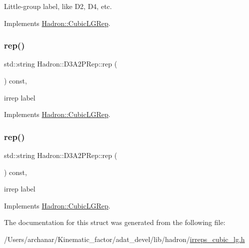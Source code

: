 Little-\/group label, like D2, D4, etc. 

Implements \mbox{\hyperlink{structHadron_1_1CubicLGRep_a9bdb14b519a611d21379ed96a3a9eb41}{Hadron\+::\+Cubic\+L\+G\+Rep}}.

\mbox{\label{structHadron_1_1D3A2PRep_a8a5821f9be07ae2bd87e63ac151c6d68}} 
\subsubsection{\texorpdfstring{rep()}{rep()}\hspace{0.1cm}{\footnotesize\ttfamily [1/2]}}
{\footnotesize\ttfamily std\+::string Hadron\+::\+D3\+A2\+P\+Rep\+::rep (\begin{DoxyParamCaption}{ }\end{DoxyParamCaption}) const\hspace{0.3cm}{\ttfamily [inline]}, {\ttfamily [virtual]}}

irrep label 

Implements \mbox{\hyperlink{structHadron_1_1CubicLGRep_a50f5ddbb8f4be4cee0106fa9e8c75e6c}{Hadron\+::\+Cubic\+L\+G\+Rep}}.

\mbox{\label{structHadron_1_1D3A2PRep_a8a5821f9be07ae2bd87e63ac151c6d68}} 
\subsubsection{\texorpdfstring{rep()}{rep()}\hspace{0.1cm}{\footnotesize\ttfamily [2/2]}}
{\footnotesize\ttfamily std\+::string Hadron\+::\+D3\+A2\+P\+Rep\+::rep (\begin{DoxyParamCaption}{ }\end{DoxyParamCaption}) const\hspace{0.3cm}{\ttfamily [inline]}, {\ttfamily [virtual]}}

irrep label 

Implements \mbox{\hyperlink{structHadron_1_1CubicLGRep_a50f5ddbb8f4be4cee0106fa9e8c75e6c}{Hadron\+::\+Cubic\+L\+G\+Rep}}.



The documentation for this struct was generated from the following file\+:\begin{DoxyCompactItemize}
\item 
/\+Users/archanar/\+Kinematic\+\_\+factor/adat\+\_\+devel/lib/hadron/\mbox{\hyperlink{lib_2hadron_2irreps__cubic__lg_8h}{irreps\+\_\+cubic\+\_\+lg.\+h}}\end{DoxyCompactItemize}
